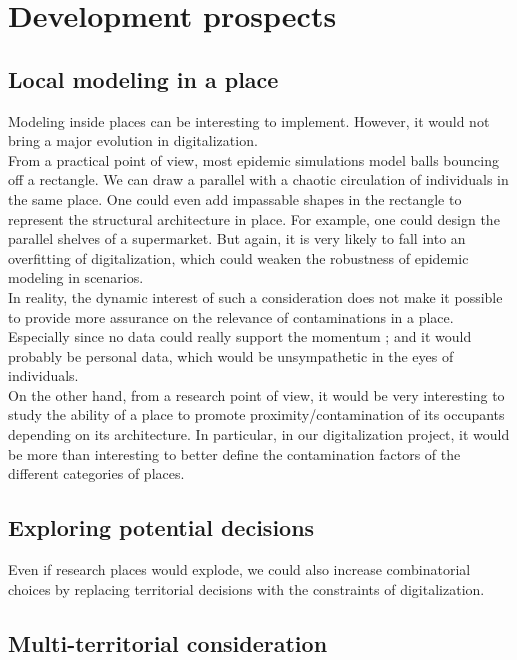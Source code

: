 \chapter{Development prospects}

\section{Local modeling in a place}

Modeling inside places can be interesting to implement. However, it would not bring a major evolution in digitalization.\\

From a practical point of view, most epidemic simulations model balls bouncing off a rectangle. We can draw a parallel with a chaotic circulation of individuals in the same place. One could even add impassable shapes in the rectangle to represent the structural architecture in place. For example, one could design the parallel shelves of a supermarket. But again, it is very likely to fall into an overfitting of digitalization, which could weaken the robustness of epidemic modeling in scenarios.\\

In reality, the dynamic interest of such a consideration does not make it possible to provide more assurance on the relevance of contaminations in a place. Especially since no data could really support the momentum ; and it would probably be personal data, which would be unsympathetic in the eyes of individuals.\\

On the other hand, from a research point of view, it would be very interesting to study the ability of a place to promote proximity/contamination of its occupants depending on its architecture. In particular, in our digitalization project, it would be more than interesting to better define the contamination factors of the different categories of places.\\

\section{Exploring potential decisions}

Even if research places would explode, we could also increase combinatorial choices by replacing territorial decisions with the constraints of digitalization.\\

\section{Multi-territorial consideration}

